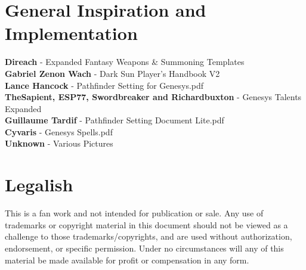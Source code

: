 \section{General Inspiration and Implementation}
\begin{centering}
\textbf{Direach} - Expanded Fantasy Weapons \& Summoning Templates\\
\textbf{Gabriel Zenon Wach} - Dark Sun Player's Handbook V2\\
\textbf{Lance Hancock} - Pathfinder Setting for Genesys.pdf\\
\textbf{TheSapient, ESP77, Swordbreaker and Richardbuxton} - Genesys Talents Expanded\\
\textbf{Guillaume Tardif} - Pathfinder Setting Document Lite.pdf\\
\textbf{Cyvaris} - Genesys Spells.pdf\\
\textbf{Unknown} - Various Pictures\\
\end{centering}

\section{Legalish}
\begin{centering}
This is a fan work and not intended for publication or sale.
Any use of trademarks or copyright material in this document should not be viewed as a challenge to
those trademarks/copyrights, and are used without authorization, endorsement, or specific permission.
Under no circumstances will any of this material be made available for profit or compensation in any form.
\end{centering}
